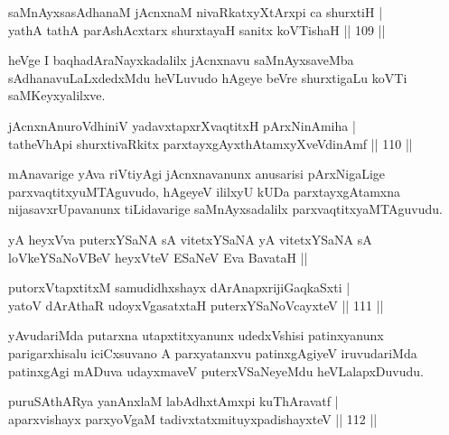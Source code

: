 \begin{shl}
saMnAyxsasAdhanaM jAcnxnaM nivaRkatxyXtArxpi ca shurxtiH |\\
yathA tathA parAshAcxtarx shurxtayaH sanitx koVTishaH \hfill || 109 ||
\end{shl}

\begin{artha}%
heVge I baqhadAraNayxkadalilx jAcnxnavu saMnAyxsaveMba sAdhanavuLaLxdedxMdu heVLuvudo hAgeye beVre shurxtigaLu koVTi saMKeyxyalilxve.
\end{artha}

\begin{shl}
jAcnxnAnuroVdhiniV yadavxtapxrXvaqtitxH pArxNinAmiha |\\
tatheVhApi shurxtivaRkitx parxtayxgAyxthAtamxyXveVdinAmf \hfill || 110 ||
\end{shl}

\begin{artha}
mAnavarige yAva riVtiyAgi jAcnxnavanunx anusarisi pArxNigaLige parxvaqtitxyuMTAguvudo, hAgeyeV ililxyU kUDa parxtayxgAtamxna nijasavxrUpavanunx tiLidavarige saMnAyxsadalilx parxvaqtitxyaMTAguvudu.
\end{artha}

\begin{shl}
yA heyxVva puterxYSaNA sA vitetxYSaNA yA vitetxYSaNA sA loVkeYSaNoVBeV heyxVteV ESaNeV Eva BavataH ||
\end{shl}


\begin{shl}
putorxVtapxtitxM samudidhxshayx dArAnapxrijiGaqkaSxti |\\
yatoV dArAthaR udoyxVgasatxtaH puterxYSaNoVcayxteV \hfill || 111 ||
\end{shl}

\begin{artha}
yAvudariMda putarxna utapxtitxyanunx udedxVshisi patinxyanunx parigarxhisalu iciCxsuvano A parxyatanxvu patinxgAgiyeV  iruvudariMda patinxgAgi mADuva udayxmaveV puterxVSaNeyeMdu heVLalapxDuvudu. 
\end{artha}

\begin{shl}
puruSAthARya yanAnxlaM labAdhxtAmx\s pi \footnotemark[1]kuThAravatf |\\
aparxvishayx parxyoVgaM tadivxtatxmituyxpadishayxteV \hfill || 112 ||
\end{shl}

